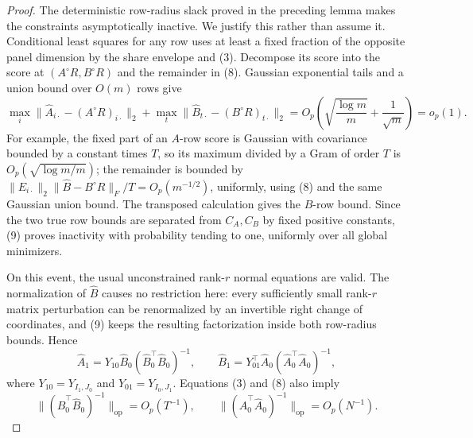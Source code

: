 \documentclass{article}
\begin{document}
\begin{proof}
The deterministic row-radius slack proved in the preceding lemma makes the constraints asymptotically inactive.  We justify this rather than assume it.  Conditional least squares for any row uses at least a fixed fraction of the opposite panel dimension by the share envelope and (3).  Decompose its score into the score at \((A^\circ R,B^\circ R)\) and the remainder in (8).  Gaussian exponential tails and a union bound over \(O(m)\) rows give
\[
 \max_i\|\widehat A_{i\cdot}-(A^\circ R)_{i\cdot}\|_2
 +\max_t\|\widehat B_{t\cdot}-(B^\circ R)_{t\cdot}\|_2
 =O_p\!\left(\sqrt{\frac{\log m}{m}}+\frac1{\sqrt m}\right)=o_p(1).
\tag{9}
\]
For example, the fixed part of an \(A\)-row score is Gaussian with covariance bounded by a constant times \(T\), so its maximum divided by a Gram of order \(T\) is \(O_p(\sqrt{\log m/m})\); the remainder is bounded by \(\|E_{i\cdot}\|_2\|\widehat B-B^\circ R\|_F/T=O_p(m^{-1/2})\), uniformly, using (8) and the same Gaussian union bound.  The transposed calculation gives the \(B\)-row bound.  Since the two true row bounds are separated from \(C_A,C_B\) by fixed positive constants, (9) proves inactivity with probability tending to one, uniformly over all global minimizers.

On this event, the usual unconstrained rank-\(r\) normal equations are valid.  The normalization of \(\widehat B\) causes no restriction here: every sufficiently small rank-\(r\) matrix perturbation can be renormalized by an invertible right change of coordinates, and (9) keeps the resulting factorization inside both row-radius bounds.  Hence
\[
 \widehat A_1
 =Y_{10}\widehat B_0(\widehat B_0^{\top}\widehat B_0)^{-1},
 \qquad
 \widehat B_1
 =Y_{01}^{\top}\widehat A_0(\widehat A_0^{\top}\widehat A_0)^{-1},
\tag{10}
\]
where \(Y_{10}=Y_{I_1,J_0}\) and \(Y_{01}=Y_{I_0,J_1}\).  Equations (3) and (8) also imply
\[
 \| (\widehat B_0^{\top}\widehat B_0)^{-1}\|_{\mathrm{op}}=O_p(T^{-1}),
 \qquad
 \| (\widehat A_0^{\top}\widehat A_0)^{-1}\|_{\mathrm{op}}=O_p(N^{-1}).
\tag{11}
\]


\end{proof}
\end{document}
